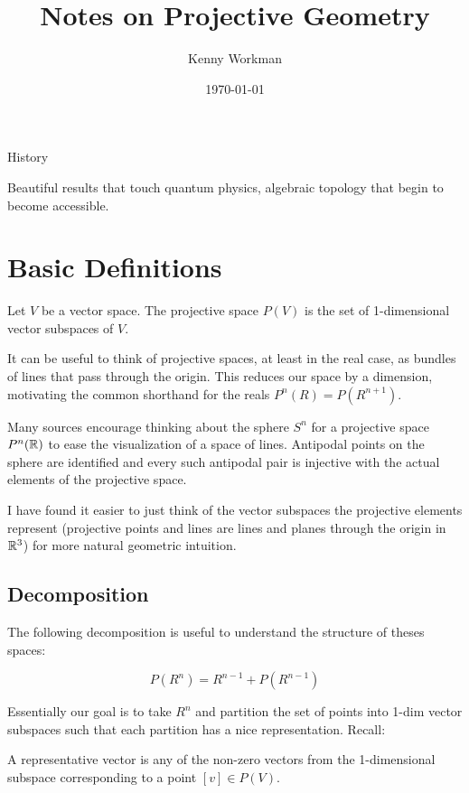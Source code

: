 \documentclass[10pt]{article}
\title{Notes on Projective Geometry}
\author{Kenny Workman}
\date{\today}
\begin{document}
\maketitle

History

Beautiful results that touch quantum physics, algebraic topology that begin to
become accessible.


\section{Basic Definitions}

\begin{definition}
	Let $V$ be a vector space. The projective space $P(V)$ is the set of 1-dimensional vector subspaces of $V$.
\end{definition}

It can be useful to think of projective spaces, at least in the real case, as
bundles of lines that pass through the origin. This reduces our space by a
dimension, motivating the common shorthand for the reals $P^n(R) = P(R^{n+1})$. 

Many sources encourage thinking about the sphere $S^n$ for a projective space
$P^n(\mathbb{R})$ to ease the visualization of a space of lines. Antipodal points on
the sphere are identified and every such antipodal pair is injective with the
actual elements of the projective space. 

I have found it easier to just think of the vector subspaces the projective
elements represent (projective points and lines are lines and planes through the
origin in $\mathbb{R}^3$) for more natural geometric intuition.

\subsection{Decomposition}

The following decomposition is useful to understand the structure of theses spaces:

\[P(R^n) = R^{n-1} + P(R^{n-1}) \]

Essentially our goal is to take $R^n$ and partition the set of points into
1-dim vector subspaces such that each partition has a nice representation.
Recall:

\begin{definition}
	A representative vector is any of the non-zero vectors from the 1-dimensional subspace corresponding to a point $[v] \in P(V)$.
\end{definition}
\end{document}
